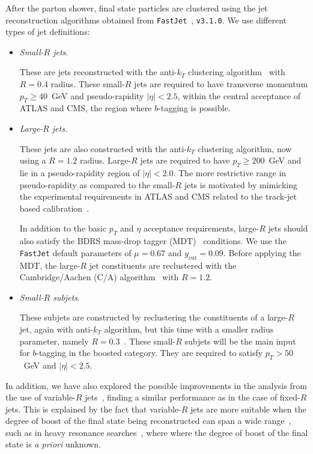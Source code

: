 After the  parton shower, final state particles
are clustered using the
jet reconstruction algorithms
obtained from
{\tt FastJet}~\cite{Cacciari:2011ma,Cacciari:2005hq},
{\tt v3.1.0}.
%
We use different types of jet definitions:
\begin{itemize}
\item {\it Small-$R$ jets}.

  These are jets  reconstructed with the
  anti-$k_T$ clustering algorithm~\cite{Cacciari:2008gp} with $R=0.4$ radius.
  These small-$R$ jets are required
  to have transverse momentum $p_T \ge 40$~GeV
  and pseudo-rapidity $|\eta|<2.5$, within the central 
  acceptance of ATLAS and CMS, the region
  where $b$-tagging is possible.

\item {\it Large-$R$ jets}.

  These jets are also constructed with the
  anti-$k_T$ clustering algorithm, now using a $R=1.2$ radius.
  Large-$R$ jets are required to have
  $p_T \ge 200$~GeV and lie in a pseudo-rapidity region of
  $|\eta|<2.0$.
  The more restrictive range  in pseudo-rapidity
  as compared to the small-$R$ jets
  is motivated by mimicking the  experimental requirements
  in ATLAS and CMS
  related to the track-jet based calibration~\cite{Aad:2014bia,ATLAS:2012kla}.

  In addition to the basic $p_T$ and $\eta$
  acceptance requirements, large-$R$ jets should also
  satisfy the  BDRS mass-drop tagger (MDT)~\cite{Butterworth:2008iy}
  conditions.
  We use the {\tt FastJet} default
  parameters of  $\mu = 0.67$ and $y_{\textrm{cut}}= 0.09$.
  Before applying the MDT, the large-$R$ jet
  constituents are reclustered with the Cambridge/Aachen (C/A)
  algorithm~\cite{Dokshitzer:1997in,Wobisch:1998wt}
  with $R=1.2$.

  
\item {\it Small-$R$ subjets}.

  These subjets are constructed by reclustering the constituents
  of a large-$R$ jet, again with  anti-$k_T$ algorithm,
  but this time with a smaller radius parameter, namely
  $R=0.3$~\cite{Aad:2015uka}.
  These small-$R$ subjets will be the main input for
  $b$-tagging in the boosted category.
  They are required to satisfy $p_T > 50$~GeV and $|\eta|<2.5$.
\end{itemize}

In addition, we have
also explored the possible improvements
in the analysis from the use
of variable-$R$ jets~\cite{Krohn:2009zg}, finding
a similar performance as in the case of fixed-$R$ jets.
%
This is explained by the fact that
variable-$R$ jets are more suitable when
the degree of boost of the final state being reconstructed can span
a wide range~\cite{Cacciari:2008gd}, such as in heavy resonance
searches~\cite{Aad:2015fna},
where where the degree of boost of the final state
is {\it a priori} unknown.


